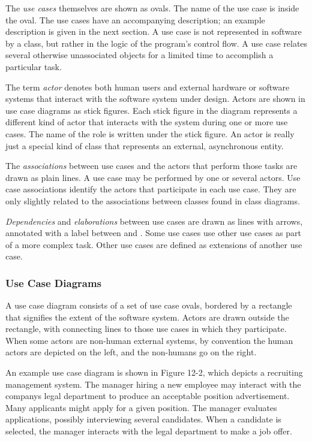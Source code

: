 The \textit{use cases} themselves are shown as ovals. The name of the
use case is inside the oval. The use cases have an accompanying
description; an example description is given in the next
section. A use case is not represented in software by a class, but
rather in the logic of the program's control flow. A
use case relates several otherwise unassociated objects for a limited
time to accomplish a particular task.

The term \textit{actor} denotes both human users and
external hardware or software systems that interact with the software
system under design. Actors are shown in use case diagrams as stick
figures. Each stick figure in the diagram represents a different kind
of actor that interacts with the system during one or more use cases.
The name of the role is written under the stick figure. An
actor is really just a special kind of class that represents an
external, asynchronous entity.

The \textit{associations} between use cases
and the actors that perform those tasks are drawn as plain lines. A use
case may be performed by one or several
actors. Use case associations identify the actors that participate in
each use case. They are only slightly related to the associations
between classes found in class diagrams.

\textit{Dependencies} and
\textit{elaboration}\textit{s} between use cases are
drawn as lines with arrows, annotated with a label between
\guillemotleft{ } and \guillemotright. Some use cases
use other use cases as part of a more complex task. Other use
cases are defined as extensions of another use case.

\subsubsection[Use Case Diagrams]{Use Case Diagrams}
A use case diagram consists of a set of use case ovals, bordered by a
rectangle that signifies the extent of the software system. Actors are
drawn outside the rectangle, with connecting lines to those use cases
in which they participate. When some actors are non-human external
systems, by convention the human actors are depicted on the left, and
the non-humans go on the right.

An example use case diagram is shown in Figure 12-2, which depicts a
recruiting management system. The manager hiring a new employee may
interact with the company{\textquotesingle}s legal department to
produce an acceptable position advertisement. Many applicants might
apply for a given position. The manager evaluates applications,
possibly interviewing several candidates. When a candidate is selected,
the manager interacts with the legal department to make a job offer.


